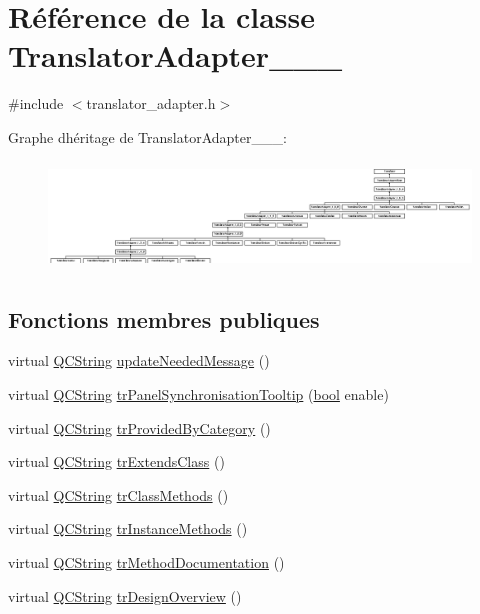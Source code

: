 \hypertarget{class_translator_adapter__1__8__2}{}\section{Référence de la classe Translator\+Adapter\+\_\+\_\+\_}
\label{class_translator_adapter__1__8__2}


{\ttfamily \#include $<$translator\+\_\+adapter.\+h$>$}

Graphe d\textquotesingle{}héritage de Translator\+Adapter\+\_\+\_\+\_\+:\begin{figure}[H]
\begin{center}
\leavevmode
\includegraphics[height=2.889306cm]{class_translator_adapter__1__8__2}
\end{center}
\end{figure}
\subsection*{Fonctions membres publiques}
\begin{DoxyCompactItemize}
\item 
virtual \hyperlink{class_q_c_string}{Q\+C\+String} \hyperlink{class_translator_adapter__1__8__2_a307747456f69ab8dcb0c2be27f429e80}{update\+Needed\+Message} ()
\item 
virtual \hyperlink{class_q_c_string}{Q\+C\+String} \hyperlink{class_translator_adapter__1__8__2_a13608bc1163641d721587d398924f09a}{tr\+Panel\+Synchronisation\+Tooltip} (\hyperlink{qglobal_8h_a1062901a7428fdd9c7f180f5e01ea056}{bool} enable)
\item 
virtual \hyperlink{class_q_c_string}{Q\+C\+String} \hyperlink{class_translator_adapter__1__8__2_a0a1548862a686357d6c6efc96aa1c89f}{tr\+Provided\+By\+Category} ()
\item 
virtual \hyperlink{class_q_c_string}{Q\+C\+String} \hyperlink{class_translator_adapter__1__8__2_a474edba60f61b2e307818381df8ec7ee}{tr\+Extends\+Class} ()
\item 
virtual \hyperlink{class_q_c_string}{Q\+C\+String} \hyperlink{class_translator_adapter__1__8__2_a12bfc4603de05d145a7529a3ce9a4ecd}{tr\+Class\+Methods} ()
\item 
virtual \hyperlink{class_q_c_string}{Q\+C\+String} \hyperlink{class_translator_adapter__1__8__2_a45cb32f3ae6bfd259801e40d8b2467b5}{tr\+Instance\+Methods} ()
\item 
virtual \hyperlink{class_q_c_string}{Q\+C\+String} \hyperlink{class_translator_adapter__1__8__2_ac36ebe637cb13898158be0b683485e9c}{tr\+Method\+Documentation} ()
\item 
virtual \hyperlink{class_q_c_string}{Q\+C\+String} \hyperlink{class_translator_adapter__1__8__2_abf6858c813ca8ee242f266e22c227982}{tr\+Design\+Overview} ()
\end{DoxyCompactItemize}
